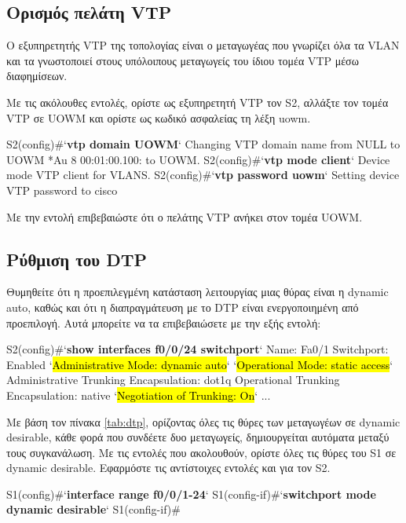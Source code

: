 \documentclass{EdipyLabs} %
\begin{document}
\subsection{Ορισμός πελάτη VTP}
Ο εξυπηρετητής VTP της τοπολογίας είναι ο μεταγωγέας που γνωρίζει όλα τα VLAN και τα γνωστοποιεί στους υπόλοιπους μεταγωγείς του ίδιου τομέα VTP μέσω διαφημίσεων. 

Με τις ακόλουθες εντολές, ορίστε ως εξυπηρετητή VTP τον S2, αλλάξτε τον τομέα VTP σε UOWM και ορίστε ως κωδικό ασφαλείας τη λέξη uowm.

\begin{CommandBox}
S2(config)#`\textbf{vtp domain UOWM}`
Changing VTP domain name from NULL to UOWM
*Au 8 00:01:00.100: %
to UOWM.
S2(config)#`\textbf{vtp mode client}`
Device mode VTP client for VLANS.
S2(config)#`\textbf{vtp password uowm}`
Setting device VTP password to cisco
\end{CommandBox}

Με την εντολή  επιβεβαιώστε ότι ο πελάτης VTP ανήκει στον τομέα UOWM.

\subsection{Ρύθμιση του DTP}
Θυμηθείτε ότι η προεπιλεγμένη κατάσταση λειτουργίας μιας θύρας είναι η dynamic auto, καθώς και ότι η διαπραγμάτευση με το DTP είναι ενεργοποιημένη από προεπιλογή. Αυτά μπορείτε να τα επιβεβαιώσετε με την εξής εντολή:

\begin{CommandBox}
S2(config)#`\textbf{show interfaces f0/0/24 switchport}`
Name: Fa0/1
Switchport: Enabled
`\hl{Administrative Mode: dynamic auto}`
`\hl{Operational Mode: static access}`
Administrative Trunking Encapsulation: dot1q
Operational Trunking Encapsulation: native
`\hl{Negotiation of Trunking: On}`
...
\end{CommandBox}

Με βάση τον πίνακα \ref{tab:dtp}, ορίζοντας όλες τις θύρες των μεταγωγέων σε dynamic desirable, κάθε φορά που συνδέετε δυο μεταγωγείς, δημιουργείται αυτόματα μεταξύ τους συγκανάλωση. Με τις εντολές που ακολουθούν, ορίστε όλες τις θύρες του S1 σε dynamic desirable. Εφαρμόστε τις αντίστοιχες εντολές και για τον S2.

\begin{CommandBox}
S1(config)#`\textbf{interface range f0/0/1-24}`
S1(config-if)#`\textbf{switchport mode dynamic desirable}`
S1(config-if)#
\end{CommandBox}
\end{document}
